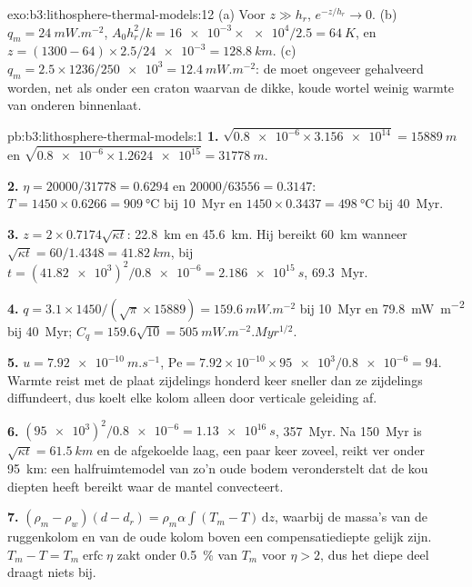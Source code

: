 \begin{solution}{exo:b3:lithosphere-thermal-models:12}
(a) Voor $z \gg h_r$, $e^{-z/h_r} \to 0$. (b) $q_m = \qty{24}{mW.m^{-2}}$,
$A_0h_r^2/k = \num{16e-3}\times\num{e4}/2.5 = \qty{64}{K}$, en $z = (1300 -
64)\times2.5/\num{24e-3} = \qty{128.8}{km}$. (c) $q_m = 2.5\times1236/\num{250e3}
= \qty{12.4}{mW.m^{-2}}$: de  moet ongeveer gehalveerd worden, net als onder een
craton waarvan de dikke, koude wortel weinig warmte van onderen binnenlaat.
\end{solution}

\begin{solution}{pb:b3:lithosphere-thermal-models:1}
\textbf{1.} $\sqrt{\num{0.8e-6}\times\num{3.156e14}} = \qty{15889}{m}$ en
$\sqrt{\num{0.8e-6}\times\num{1.2624e15}} = \qty{31778}{m}$.

\textbf{2.} $\eta = 20000/31778 = 0.6294$ en $20000/63556 = 0.3147$:
$T = 1450\times0.6266 = \qty{909}{\celsius}$ bij \qty{10}{Myr} en
$1450\times0.3437 = \qty{498}{\celsius}$ bij \qty{40}{Myr}.

\textbf{3.} $z = 2\times0.7174\sqrt{\kappa t}$: \qty{22.8}{km} en
\qty{45.6}{km}. Hij bereikt \qty{60}{km} wanneer $\sqrt{\kappa t} = 60/1.4348 =
\qty{41.82}{km}$, bij $t = (\num{41.82e3})^2/\num{0.8e-6} = \qty{2.186e15}{s}$,
\qty{69.3}{Myr}.

\textbf{4.} $q = 3.1\times1450/(\sqrt\pi\times15889) = \qty{159.6}{mW.m^{-2}}$ bij
\qty{10}{Myr} en \qty{79.8}{mW.m^{-2}} bij \qty{40}{Myr}; $C_q = 159.6\sqrt{10}
= \qty{505}{mW.m^{-2}.Myr^{1/2}}$.

\textbf{5.} $u = \qty{7.92e-10}{m.s^{-1}}$, $\mathrm{Pe} = 7.92\times10^{-10}
\times\num{95e3}/\num{0.8e-6} = 94$. Warmte reist met de plaat zijdelings
honderd keer sneller dan ze zijdelings diffundeert, dus koelt elke kolom
alleen door verticale geleiding af.

\textbf{6.} $(\num{95e3})^2/\num{0.8e-6} = \qty{1.13e16}{s}$, \qty{357}{Myr}.
Na \qty{150}{Myr} is $\sqrt{\kappa t} = \qty{61.5}{km}$ en de afgekoelde laag,
een paar keer zoveel, reikt ver onder \qty{95}{km}: een halfruimtemodel van zo'n oude
bodem veronderstelt dat de kou diepten heeft bereikt waar de mantel convecteert.

\textbf{7.} $(\rho_m - \rho_w)(d - d_r) = \rho_m\alpha\int(T_m - T)\,\mathrm dz$,
waarbij de massa's van de ruggenkolom en van de oude kolom boven een
compensatiediepte gelijk zijn. $T_m - T = T_m\operatorname{erfc}\eta$
zakt onder \qty{0.5}{\percent} van $T_m$ voor $\eta > 2$, dus het diepe deel draagt niets bij.


\end{solution}
